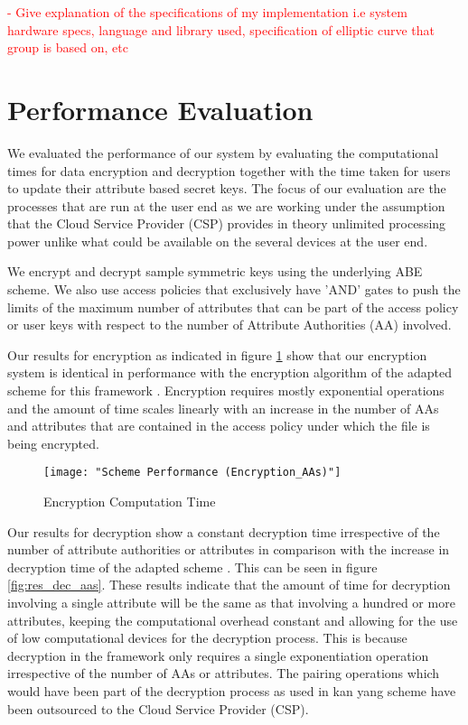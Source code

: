 \textcolor{red}{- Give explanation of the specifications of my implementation i.e system hardware specs, language and library used, specification of elliptic curve that group is based on, etc}

\section{Performance Evaluation}

We evaluated the performance of our system by evaluating the computational times for data encryption and decryption together with the time taken for users to update their attribute based secret keys. The focus of our evaluation are the processes that are run at the user end as we are working under the assumption that the Cloud Service Provider (CSP) provides in theory unlimited processing power unlike what could be available on the several devices at the user end.

We encrypt and decrypt sample symmetric keys using the underlying ABE scheme. We also use access policies that exclusively have 'AND' gates to push the limits of the maximum number of attributes that can be part of the access policy or user keys with respect to the number of Attribute Authorities (AA) involved.

Our results for encryption as indicated in figure \ref{fig:res_enc_aas} show that our encryption system is identical in performance with the encryption algorithm of the adapted scheme for this framework \cite{Yang2014}. Encryption requires mostly exponential operations and the amount of time scales linearly with an increase in the number of AAs and attributes that are contained in the access policy under which the file is being encrypted.

\begin{figure}[h]
	\centering
	\texttt{[image: "Scheme Performance (Encryption\_AAs)"]}
	\caption{Encryption Computation Time}
	\label{fig:res_enc_aas}
\end{figure}

Our results for decryption show a constant decryption time irrespective of the number of attribute authorities or attributes in comparison with the increase in decryption time of the adapted scheme \cite{Yang2014}. This can be seen in figure \ref{fig:res_dec_aas}. These results indicate that the amount of time for decryption involving a single attribute will be the same as that involving a hundred or more attributes, keeping the computational overhead constant and allowing for the use of low computational devices for the decryption process. This is because decryption in the framework only requires a single exponentiation operation irrespective of the number of AAs or attributes. The pairing operations which would have been part of the decryption process as used in kan yang scheme\cite{Yang2014} have been outsourced to the Cloud Service Provider (CSP).

